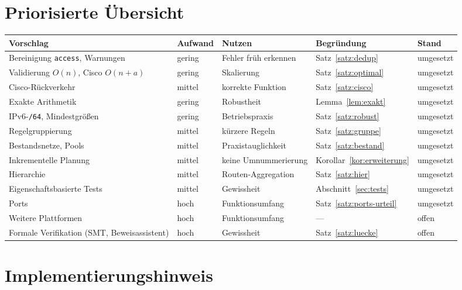 \documentclass[a4paper,12pt, twoside]{report}
\theoremstyle{definition}
\begin{document}
\section{Priorisierte Übersicht}

\begin{center}
\small
\begin{tabularx}{\textwidth}{Xllll}
\toprule
Vorschlag & Aufwand & Nutzen & Begründung & Stand \\
\midrule
Bereinigung \texttt{access}, Warnungen & gering & Fehler früh erkennen & Satz~\ref{satz:dedup} & umgesetzt \\
Validierung $O(n)$, Cisco $O(n+a)$ & gering & Skalierung & Satz~\ref{satz:optimal} & umgesetzt \\
Cisco-Rückverkehr & mittel & korrekte Funktion & Satz~\ref{satz:cisco} & umgesetzt \\
Exakte Arithmetik & gering & Robustheit & Lemma~\ref{lem:exakt} & umgesetzt \\
IPv6-\texttt{/64}, Mindestgrößen & gering & Betriebspraxis & Satz~\ref{satz:robust} & umgesetzt \\
Regelgruppierung & mittel & kürzere Regeln & Satz~\ref{satz:gruppe} & umgesetzt \\
Bestandsnetze, Pools & mittel & Praxistauglichkeit & Satz~\ref{satz:bestand} & umgesetzt \\
Inkrementelle Planung & mittel & keine Umnummerierung & Korollar~\ref{kor:erweiterung} & umgesetzt \\
Hierarchie & mittel & Routen-Aggregation & Satz~\ref{satz:hier} & umgesetzt \\
Eigenschaftsbasierte Tests & mittel & Gewissheit & Abschnitt~\ref{sec:tests} & umgesetzt \\
Ports & hoch & Funktionsumfang & Satz~\ref{satz:ports-urteil} & umgesetzt \\
Weitere Plattformen & hoch & Funktionsumfang & --- & offen \\
Formale Verifikation (SMT, Beweisassistent) & hoch & Gewissheit & Satz~\ref{satz:luecke} & offen \\
\bottomrule
\end{tabularx}
\end{center}

\section{Implementierungshinweis}
\end{document}
